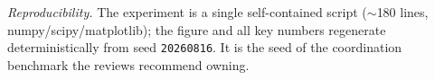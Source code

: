 \documentclass[11pt,a4paper]{article}
\begin{document}
\vspace{0.5em}
\noindent\emph{Reproducibility.} The experiment is a single self-contained script ($\sim$180 lines, numpy/scipy/matplotlib); the figure and all key numbers regenerate deterministically from seed \texttt{20260816}. It is the seed of the coordination benchmark the reviews recommend owning.
\end{document}
